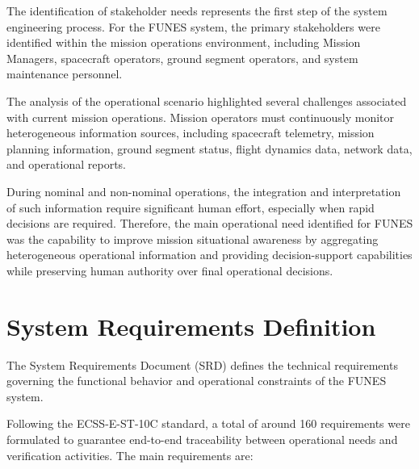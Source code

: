 The identification of stakeholder needs represents the first step of the system engineering process. For the FUNES system, the primary stakeholders were identified within the mission operations environment, including Mission Managers, spacecraft operators, ground segment operators, and system maintenance personnel.

The analysis of the operational scenario highlighted several challenges associated with current mission operations. Mission operators must continuously monitor heterogeneous information sources, including spacecraft telemetry, mission planning information, ground segment status, flight dynamics data, network data, and operational reports.

During nominal and non-nominal operations, the integration and interpretation of such information require significant human effort, especially when rapid decisions are required. Therefore, the main operational need identified for FUNES was the capability to improve mission situational awareness by aggregating heterogeneous operational information and providing decision-support capabilities while preserving human authority over final operational decisions.



\section{System Requirements Definition}

The System Requirements Document (SRD) defines the technical requirements governing the functional behavior and operational constraints of the FUNES system.

Following the ECSS-E-ST-10C standard, a total of around 160 requirements were formulated to guarantee end-to-end traceability between operational needs and verification activities. The main requirements are:

